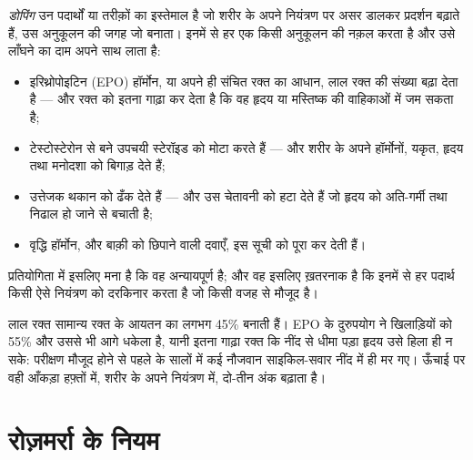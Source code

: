 \begin{proposition}[डोपिंग]\label{prop:g10:sport-and-health:doping}
\emph{डोपिंग} उन पदार्थों या तरीक़ों का इस्तेमाल है जो शरीर
के अपने नियंत्रण पर असर डालकर प्रदर्शन बढ़ाते हैं, उस अनुकूलन की जगह जो
 बनाता। इनमें से हर एक किसी अनुकूलन की नक़ल करता है और उसे
लाँघने का दाम अपने साथ लाता है:
\begin{itemize}
  \item इरिथ्रोपोइटिन (EPO) हॉर्मोन, या अपने ही संचित रक्त का आधान, लाल
        रक्त  की संख्या बढ़ा देता है --- और रक्त को इतना गाढ़ा कर
        देता है कि वह हृदय या मस्तिष्क की वाहिकाओं में जम सकता है;
  \item टेस्टोस्टेरोन से बने उपचयी स्टेरॉइड  को मोटा करते हैं
        --- और शरीर के अपने हॉर्मोनों, यकृत, हृदय तथा मनोदशा को बिगाड़
        देते हैं;
  \item उत्तेजक थकान को ढँक देते हैं --- और उस चेतावनी को हटा देते हैं जो
        हृदय को अति-गर्मी तथा निढाल हो जाने से बचाती है;
  \item वृद्धि हॉर्मोन, और बाक़ी को छिपाने वाली दवाएँ, इस सूची को पूरा कर
        देती हैं।
\end{itemize}
प्रतियोगिता में  इसलिए मना है कि वह अन्यायपूर्ण है; और वह इसलिए
ख़तरनाक है कि इनमें से हर पदार्थ किसी ऐसे नियंत्रण को दरकिनार करता है जो
किसी वजह से मौजूद है।
\end{proposition}
\admitted

\begin{example}[अंकों में EPO]\label{ex:g10:sport-and-health:epo}
लाल रक्त  सामान्य रक्त के आयतन का लगभग 45\% बनाती हैं। EPO के
दुरुपयोग ने खिलाड़ियों को 55\% और उससे भी आगे धकेला है, यानी इतना गाढ़ा
रक्त कि नींद से धीमा पड़ा हृदय उसे हिला ही न सके: परीक्षण मौजूद होने से
पहले के सालों में कई नौजवान साइकिल-सवार नींद में ही मर गए। ऊँचाई पर
 वही आँकड़ा हफ़्तों में, शरीर के अपने नियंत्रण में, दो-तीन अंक
बढ़ाता है।
\end{example}

\section{रोज़मर्रा के नियम}

